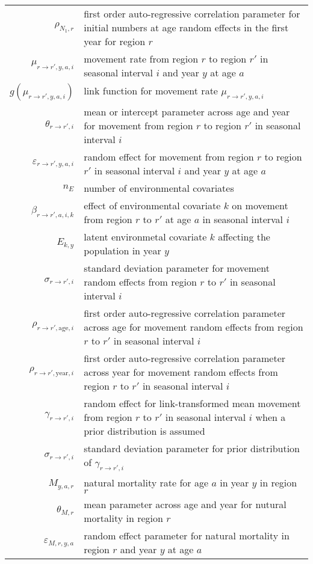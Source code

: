 \begin{longtable}[c]{r p{}}
$\rho_{N_1,r}$ & first order auto-regressive correlation parameter for initial numbers at age random effects in the first year for region $r$\\
$\mu_{r\rightarrow r',y,a,i}$ & movement rate from region $r$ to region $r'$ in seasonal interval $i$ and year $y$ at age $a$\\
$g(\mu_{r\rightarrow r',y,a,i})$ & link function for movement rate $\mu_{r\rightarrow r',y,a,i}$\\
$\theta_{r\rightarrow r',i}$ & mean or intercept parameter across age and year for movement from region $r$ to region $r'$ in seasonal interval $i$\\
$\varepsilon_{r\rightarrow r',y,a,i}$ & random effect for movement from region $r$ to region $r'$ in seasonal interval $i$ and year $y$ at age $a$\\
$n_E$ & number of environmental covariates\\
$\beta_{r \rightarrow r',a,i,k}$ & effect of environmental covariate $k$ on movement from region $r$ to $r'$ at age $a$ in seasonal interval $i$\\
$E_{k,y}$ & latent environmetal covariate $k$ affecting the population in year $y$\\
$\sigma_{r \rightarrow r',i}$ & standard deviation parameter for movement random effects from region $r$ to $r'$ in seasonal interval $i$\\
$\rho_{r \rightarrow r',\text{age},i}$ & first order auto-regressive correlation parameter across age for movement random effects from region $r$ to $r'$ in seasonal interval $i$\\
$\rho_{r \rightarrow r',\text{year},i}$ & first order auto-regressive correlation parameter across year for movement random effects from region $r$ to $r'$ in seasonal interval $i$\\
$\gamma_{r\rightarrow r',i}$ & random effect for link-transformed mean movement from region $r$ to $r'$ in seasonal interval $i$ when a prior distribution is assumed\\
$\sigma_{r\rightarrow r',i}$ & standard deviation parameter for prior distribution of $\gamma_{r\rightarrow r',i}$\\
$M_{y,a,r}$ & natural mortality rate for age $a$ in year $y$ in region $r$\\
$\theta_{M,r}$ & mean parameter across age and year for nutural mortality in region $r$\\
$\varepsilon_{M,r,y,a}$ & random effect parameter for natural mortality in region $r$ and year $y$ at age $a$\\

\end{longtable}
